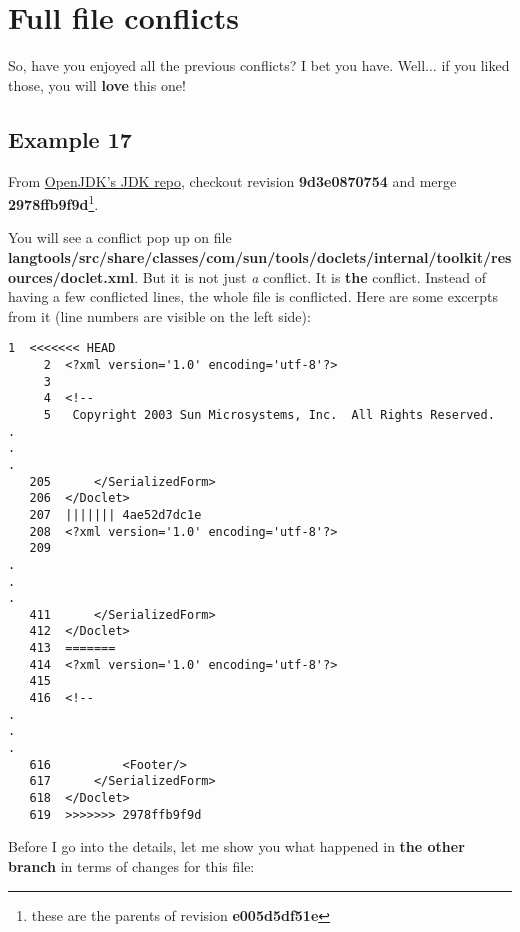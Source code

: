 
\section{Full file conflicts}

So, have you enjoyed all the previous conflicts? I bet you have. Well... if you liked those, you will {\bf love} this one!

\subsection{Example 17}

From \hyperref[openjdk_repo]{OpenJDK's JDK repo}, checkout revision {\bf 9d3e0870754} and merge {\bf 2978ffb9f9d}\footnote{these are
the parents of revision {\bf e005d5df51e}}.

You will see a conflict pop up on file {\bf langtools/src/share/classes/com/sun/tools/doclets/internal/toolkit/resources/doclet.xml}.
But it is not just {\it a} conflict. It is {\bf the} conflict. Instead of having a few conflicted lines, the whole file is conflicted.
Here are some excerpts from it (line numbers are visible on the left side):

\begin{lstlisting}[style=console_style,
	basicstyle=\small,
	caption={\bf example 17} - conflicted file]
     1  <<<<<<< HEAD
     2  <?xml version='1.0' encoding='utf-8'?>
     3  
     4  <!--
     5   Copyright 2003 Sun Microsystems, Inc.  All Rights Reserved.
.
.
.
   205      </SerializedForm>
   206  </Doclet>
   207  ||||||| 4ae52d7dc1e
   208  <?xml version='1.0' encoding='utf-8'?>
   209  
.
.
.
   411      </SerializedForm>
   412  </Doclet>
   413  =======
   414  <?xml version='1.0' encoding='utf-8'?>
   415  
   416  <!--
.
.
.
   616          <Footer/>
   617      </SerializedForm>
   618  </Doclet>
   619  >>>>>>> 2978ffb9f9d
\end{lstlisting}

Before I go into the details, let me show you what happened in {\bf the other branch} in terms of changes for this file:

